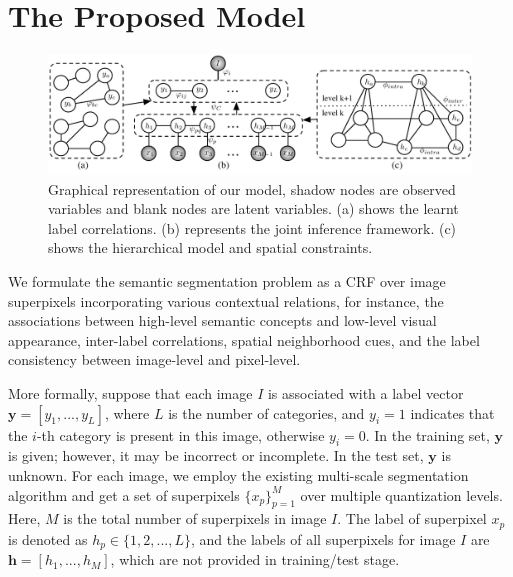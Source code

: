 
\section{The Proposed Model}

\begin{figure}[htb]
    \begin{center}
        \includegraphics[width=0.9\linewidth]{graphmodel.pdf}
    \end{center}
    \vspace{-3mm}
    \caption{Graphical representation of our model, shadow nodes are observed variables and blank nodes are latent variables. (a) shows the learnt label correlations. (b) represents the joint inference framework. (c) shows the hierarchical model and spatial constraints.}
    \label{fig:graphmodel}
\end{figure}

We formulate the semantic segmentation problem as a CRF over image superpixels incorporating various contextual relations, for instance, the associations between high-level semantic concepts and low-level visual appearance, inter-label correlations, spatial neighborhood cues, and the label consistency between image-level and pixel-level.


More formally, suppose that each image $I$ is associated with a label vector $\boldsymbol{y} = [y_1,...,y_L]$, where $L$ is the number of categories, and $y_i=1$ indicates that the $i$-th category is present in this image, otherwise $y_i=0$. In the training set, $\boldsymbol{y}$ is given; however, it may be incorrect or incomplete. In the test set, $\boldsymbol{y}$ is unknown.
For each image, we employ the existing multi-scale segmentation algorithm and get a set of superpixels   $\{x_p\}_{p=1}^M$ over multiple quantization levels.
Here, $M$ is the total number of superpixels in image $I$.
The label of superpixel $x_p$ is denoted as $h_p\in \{1,2,...,L\}$, and the labels of all superpixels for image $I$ are $\boldsymbol{h}=[h_1,...,h_M]$, which are not provided in training/test stage.

